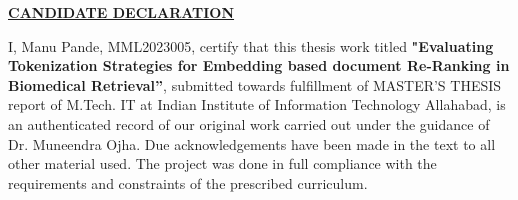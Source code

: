 
\begin{center}
{\underline{\bf\Large CANDIDATE DECLARATION }}\\
\par\vspace{5mm}
\end{center}
\noindent I, Manu Pande, MML2023005, certify that this thesis work titled
\textbf{"Evaluating Tokenization Strategies for Embedding based document Re-Ranking in Biomedical Retrieval”}, submitted
towards fulfillment of MASTER'S THESIS report of M.Tech. IT at Indian Institute of
Information Technology Allahabad, is an authenticated record of our original work carried out under the
guidance of Dr. Muneendra Ojha. Due acknowledgements have been made in the text to all other
material used. The project was done in full compliance with the requirements and constraints of the prescribed
curriculum.

\vspace{25mm}

